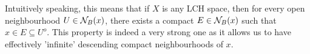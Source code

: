 \documentclass[../../main.tex]{subfiles}
\begin{document}
\remark Intuitively speaking, this means that if $X$ is any LCH space, then for every open neighbourhood $U\in\mathcal{N}_B({x})$, there exists a compact $E\in\mathcal{N}_B({x})$ such that $x\in E\subseteq U^o$. This property is indeed a very strong one as it allows us to have effectively 'infinite' descending compact neighbourhoods of $x$.
\end{document}
